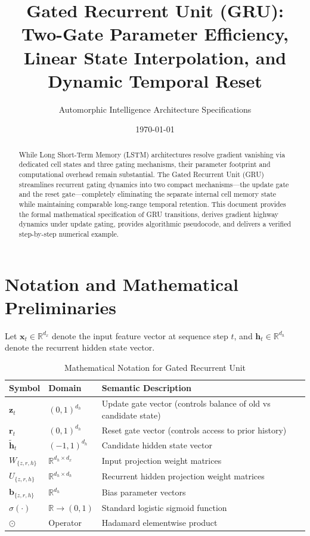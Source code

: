 \documentclass[11pt,a4paper]{article}
\title{Gated Recurrent Unit (GRU): Two-Gate Parameter Efficiency, Linear State Interpolation, and Dynamic Temporal Reset}
\author{Automorphic Intelligence Architecture Specifications}
\date{\today}
\theoremstyle{definition}
\begin{document}
\maketitle

\begin{abstract}
While Long Short-Term Memory (LSTM) architectures resolve gradient vanishing via dedicated cell states and three gating mechanisms, their parameter footprint and computational overhead remain substantial. The Gated Recurrent Unit (GRU) streamlines recurrent gating dynamics into two compact mechanisms—the update gate and the reset gate—completely eliminating the separate internal cell memory state while maintaining comparable long-range temporal retention. This document provides the formal mathematical specification of GRU transitions, derives gradient highway dynamics under update gating, provides algorithmic pseudocode, and delivers a verified step-by-step numerical example.
\end{abstract}

\section{Notation and Mathematical Preliminaries}

Let $\mathbf{x}_t \in \mathbb{R}^{d_x}$ denote the input feature vector at sequence step $t$, and $\mathbf{h}_t \in \mathbb{R}^{d_h}$ denote the recurrent hidden state vector.

\begin{table}[h]
\centering
\caption{Mathematical Notation for Gated Recurrent Unit}
\begin{tabular}{lll}
\toprule
\textbf{Symbol} & \textbf{Domain} & \textbf{Semantic Description} \\
\midrule
$\mathbf{z}_t$ & $(0, 1)^{d_h}$ & Update gate vector (controls balance of old vs candidate state) \\
$\mathbf{r}_t$ & $(0, 1)^{d_h}$ & Reset gate vector (controls access to prior history) \\
$\tilde{\mathbf{h}}_t$ & $(-1, 1)^{d_h}$ & Candidate hidden state vector \\
$W_{\{z,r,h\}}$ & $\mathbb{R}^{d_h \times d_x}$ & Input projection weight matrices \\
$U_{\{z,r,h\}}$ & $\mathbb{R}^{d_h \times d_h}$ & Recurrent hidden projection weight matrices \\
$\mathbf{b}_{\{z,r,h\}}$ & $\mathbb{R}^{d_h}$ & Bias parameter vectors \\
$\sigma(\cdot)$ & $\mathbb{R} \to (0, 1)$ & Standard logistic sigmoid function \\
$\odot$ & Operator & Hadamard elementwise product \\
\bottomrule
\end{tabular}
\end{table}
\end{document}
